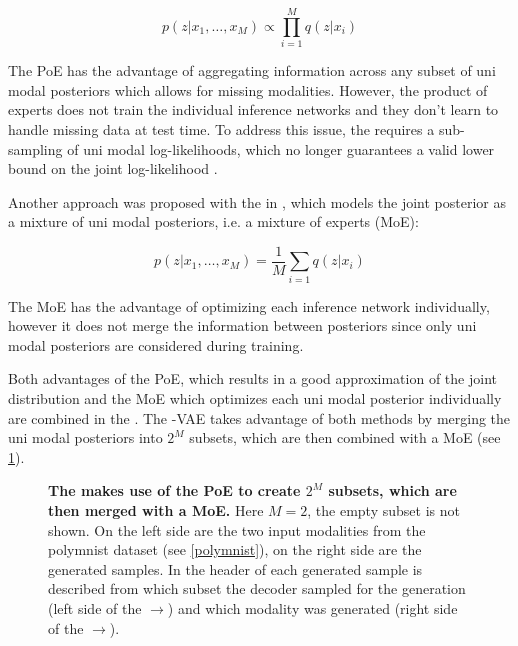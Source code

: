 \begin{equation}
    p(z|x_1,\ldots,x_M) \propto \prod ^M _{i=1} q(z|x_i)
\end{equation}

The PoE has the advantage of aggregating information across any subset of uni modal posteriors which allows for missing modalities.
However, the product of experts does not train the individual inference networks and they don't learn to handle missing data at test time.
To address this issue, the  requires a sub-sampling of uni modal log-likelihoods, which no longer guarantees a valid lower bound on the joint log-likelihood \parencite{wu_multimodal_2019}.

Another approach was proposed with the  in \cite{shi2019variational}, which models the joint posterior as a mixture of uni modal posteriors, i.e. a mixture of experts (MoE):

\begin{equation}
    p(z|x_1,\ldots,x_M) = \frac{1}{M} \sum _{i=1} q(z|x_i)
\end{equation}

The MoE has the advantage of optimizing each inference network individually, however it does not merge the information between posteriors since only uni modal posteriors are considered during training.

Both advantages of the PoE, which results in a good approximation of the joint distribution and the MoE which optimizes each uni modal posterior individually are combined in the  \parencite{thomas_gener-ELBO}.
The -VAE takes advantage of both methods by merging the uni modal posteriors into $2^M$ subsets, which are then combined with a MoE (see \cref{mopoeGraph}).

\begin{figure}[h!]
    \centering
    \caption{\textbf{The  makes use of the PoE to create $2^M$ subsets, which are then merged with a MoE.} Here $M=2$, the empty subset is not shown. On the left side are the two input modalities from the polymnist dataset (see \cref{polymnist}), on the right side are the generated samples. In the header of each generated sample is described from which subset the decoder sampled for the generation (left side of the $\rightarrow$) and which modality was generated (right side of the $\rightarrow$).}
    \label{mopoeGraph}
\end{figure}

